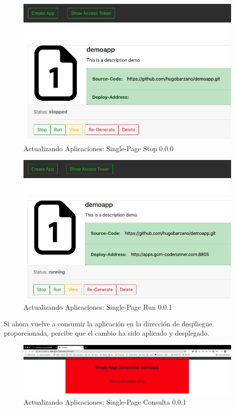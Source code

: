 \documentclass[a4paper,11pt]{book}
\begin{document}
   \begin{figure}[H]
\centering
\includegraphics[scale=0.4]{imagenes/casouso_a/2_10.png}
\caption{   Actualizando Aplicaciones: Single-Page Stop 0.0.0  }
\label{2_10}
\end{figure}
 
 
   \begin{figure}[H]
\centering
\includegraphics[scale=0.4]{imagenes/casouso_a/2_11.png}
\caption{   Actualizando Aplicaciones: Single-Page Run 0.0.1  }
\label{2_11}
\end{figure}
 
 Si ahora vuelve a consumir la aplicación en la dirección de despliegue proporcionada, percibe que el cambio ha sido aplicado y desplegado. 
 
 
   \begin{figure}[H]
\centering
\includegraphics[scale=0.23]{imagenes/casouso_a/2_12.png}
\caption{  Actualizando Aplicaciones: Single-Page Consulta 0.0.1 }
\label{2_12}
\end{figure}
\end{document}
